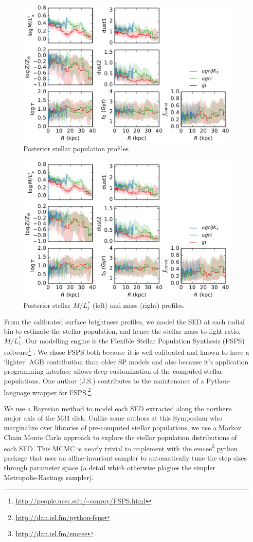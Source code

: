 \documentclass{iau}
\begin{document}
\begin{figure}
\centering
\includegraphics[width=0.5\columnwidth]{pop_profile} 
\caption{Posterior stellar population profiles.}\label{fig:pop_profile}
\end{figure}

\begin{figure}
\centering
\includegraphics[width=0.5\columnwidth]{pop_profile} 
\caption{Posterior stellar $M/L_i^*$ (left) and mass (right) profiles.}\label{fig:mass_profile}
\end{figure}

From the calibrated surface brightness profiles, we model the SED at each radial bin to estimate the stellar population, and hence the stellar mass-to-light ratio, $M/L_i^*$.
Our modelling engine is the Flexible Stellar Population Synthesis (FSPS) software\footnote{\url{http://people.ucsc.edu/~conroy/FSPS.html}} \citep{Conroy:2009,Conroy:2010}.
We chose FSPS both because it is well-calibrated and known to have a `lighter' AGB contribution than older SP models \citep[e.g.,][]{Bruzual:2003} and also because it's application programming interface allows deep customization of the computed stellar populations.
One author (J.S.) contributes to the maintenance of a Python-language wrapper for FSPS.\footnote{\url{http://dan.iel.fm/python-fsps}}.

We use a Bayesian method to model each SED extracted along the northern major axis of the M31 disk.
Unlike some authors at this Symposium who marginalize over libraries of pre-computed stellar populations, we use a Markov Chain Monte Carlo approach to explore the stellar population distributions of each SED.
This MCMC is nearly trivial to implement with the emcee\footnote{\url{http://dan.iel.fm/emcee}} python package \citep{Foreman-Mackey:2010} that uses an affine-invariant sampler \cite{Goodman:2009} to automatically tune the step sizes through parameter space (a detail which otherwise plagues the simpler Metropolis-Hastings sampler).
\end{document}
